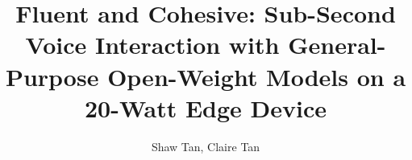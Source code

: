 \documentclass[journal]{IEEEtran}
\begin{document}
\title{Fluent and Cohesive: Sub-Second Voice Interaction with General-Purpose Open-Weight Models on a 20-Watt Edge Device}
%
%
%

\author{Shaw Tan,
        Claire Tan
}

% 
%













\maketitle
\end{document}

